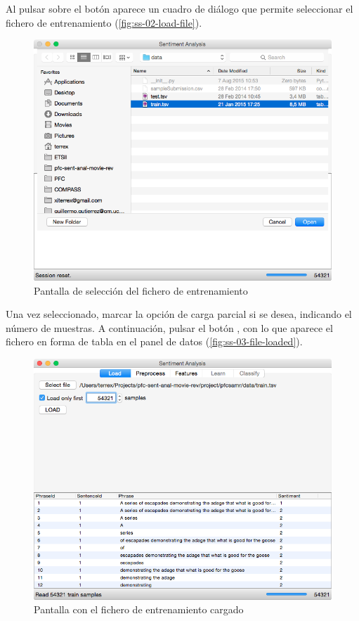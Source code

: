 \newpage
Al pulsar sobre el botón  aparece un cuadro de diálogo que permite seleccionar el fichero  de entrenamiento (\autoref{fig:ss-02-load-file}).

\begin{figure}[H]
\centering
\includegraphics[width=14cm]{ss-02-load-file}
\caption{Pantalla de selección del fichero de entrenamiento}
\label{fig:ss-02-load-file}
\end{figure}

\newpage
Una vez seleccionado, marcar la opción de carga parcial si se desea, indicando el número de muestras. A continuación, pulsar el botón , con lo que aparece el fichero en forma de tabla en el panel de datos (\autoref{fig:ss-03-file-loaded}).

\begin{figure}[H]
\centering
\includegraphics[width=14cm]{ss-03-file-loaded}
\caption{Pantalla con el fichero de entrenamiento cargado}
\label{fig:ss-03-file-loaded}
\end{figure}

